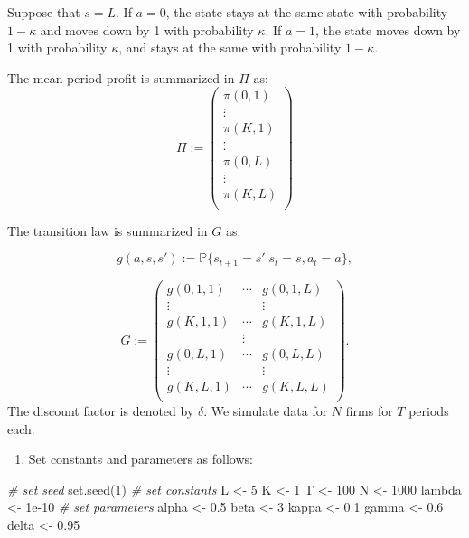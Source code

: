 \documentclass[
]{book}
\newenvironment{Shaded}{\begin{snugshade}}{\end{snugshade}}
\newcommand{\CommentTok}[1]{\textcolor[rgb]{0.56,0.35,0.01}{\textit{#1}}}
\newcommand{\DecValTok}[1]{\textcolor[rgb]{0.00,0.00,0.81}{#1}}
\newcommand{\FloatTok}[1]{\textcolor[rgb]{0.00,0.00,0.81}{#1}}
\newcommand{\FunctionTok}[1]{\textcolor[rgb]{0.00,0.00,0.00}{#1}}
\newcommand{\NormalTok}[1]{#1}
\newcommand{\OtherTok}[1]{\textcolor[rgb]{0.56,0.35,0.01}{#1}}
\providecommand{\tightlist}{%
  \setlength{\itemsep}{0pt}\setlength{\parskip}{0pt}}
\begin{document}
Suppose that \(s = L\). If \(a = 0\), the state stays at the same state with probability \(1 - \kappa\) and moves down by 1 with probability \(\kappa\). If \(a = 1\), the state moves down by 1 with probability \(\kappa\), and stays at the same with probability \(1 - \kappa\).

The mean period profit is summarized in \(\Pi\) as:
\[
\Pi :=
\begin{pmatrix}
\pi(0, 1)\\
\vdots\\
\pi(K, 1)\\
\vdots \\
\pi(0, L)\\
\vdots\\
\pi(K, L)\\
\end{pmatrix}
\]

The transition law is summarized in \(G\) as:

\[
g(a, s, s') := \mathbb{P}\{s_{t + 1} = s'|s_t = s, a_t = a\},
\]

\[
G := 
\begin{pmatrix}
g(0, 1, 1) & \cdots & g(0, 1, L)\\
\vdots & & \vdots \\
g(K, 1, 1) & \cdots & g(K, 1, L)\\
& \vdots & \\
g(0, L, 1) & \cdots & g(0, L, L)\\
\vdots & & \vdots \\
g(K, L, 1) & \cdots & g(K, L, L)\\
\end{pmatrix}.
\]
The discount factor is denoted by \(\delta\). We simulate data for \(N\) firms for \(T\) periods each.

\begin{enumerate}
\def\labelenumi{\arabic{enumi}.}
\tightlist
\item
  Set constants and parameters as follows:
\end{enumerate}

\begin{Shaded}
\begin{Highlighting}[]
\CommentTok{\# set seed}
\FunctionTok{set.seed}\NormalTok{(}\DecValTok{1}\NormalTok{)}
\CommentTok{\# set constants }
\NormalTok{L }\OtherTok{\textless{}{-}} \DecValTok{5}
\NormalTok{K }\OtherTok{\textless{}{-}} \DecValTok{1}
\NormalTok{T }\OtherTok{\textless{}{-}} \DecValTok{100}
\NormalTok{N }\OtherTok{\textless{}{-}} \DecValTok{1000}
\NormalTok{lambda }\OtherTok{\textless{}{-}} \FloatTok{1e{-}10}
\CommentTok{\# set parameters}
\NormalTok{alpha }\OtherTok{\textless{}{-}} \FloatTok{0.5}
\NormalTok{beta }\OtherTok{\textless{}{-}} \DecValTok{3}
\NormalTok{kappa }\OtherTok{\textless{}{-}} \FloatTok{0.1}
\NormalTok{gamma }\OtherTok{\textless{}{-}} \FloatTok{0.6}
\NormalTok{delta }\OtherTok{\textless{}{-}} \FloatTok{0.95}
\end{Highlighting}
\end{Shaded}
\end{document}
